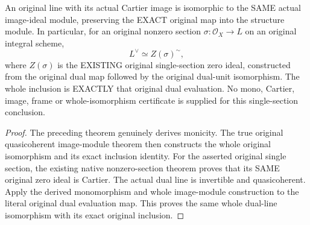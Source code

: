 \begin{theorem}
\label{thm:fc-original-line-zero-ideal-module}
\leanok
{}
An original line with its actual Cartier image is isomorphic to the SAME
actual image-ideal module, preserving the EXACT original map into the
structure module. In particular, for an original nonzero section
$\sigma:\mathcal O_X\to L$ on an original integral scheme,
\[
 L^\vee\simeq Z(\sigma)^{\sim},
\]
where $Z(\sigma)$ is the EXISTING original single-section zero ideal,
constructed from the original dual map followed by the original dual-unit
isomorphism. The whole inclusion is EXACTLY that original dual evaluation.
No mono, Cartier, image, frame or whole-isomorphism certificate is supplied
for this single-section conclusion.
\end{theorem}
\begin{proof}
The preceding theorem genuinely derives monicity. The true original
quasicoherent image-module theorem then constructs the whole original
isomorphism and its exact inclusion identity. For the asserted original
single section, the existing native nonzero-section theorem proves that
its SAME original zero ideal is Cartier. The actual dual line is invertible
and quasicoherent. Apply the derived monomorphism and whole image-module
construction to the literal original dual evaluation map. This proves
the same whole dual-line isomorphism with its exact original inclusion.
\end{proof}
